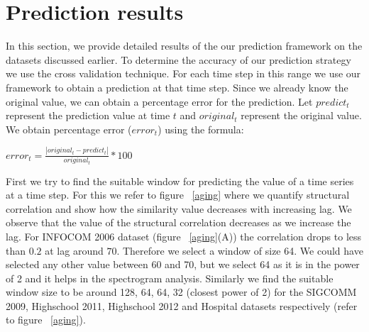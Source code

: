 \noindent
\section{Prediction results}
\label{result}
In this section, we provide detailed results of the our prediction framework on the datasets discussed earlier.
To determine the accuracy of our prediction strategy we use the cross validation technique.  
For each time step in this range we 
use our framework to obtain a prediction at that time step. Since we already know the original value, we can obtain a percentage error for the prediction.
Let $predict_{t}$ represent the prediction value at time $t$ and $original_{t}$ represent the original value. We obtain percentage error ($error_{t}$) using the formula:
\begin{center}
 {\large$error_{t}=\frac{|original_{t}-predict_{t}|}{original_{t}}*100$}
\end{center}

First we try to find the suitable window for predicting the value of a time series at a time step. For this we refer to figure ~\ref{aging} where 
we quantify structural correlation and show how the similarity value decreases with increasing lag.
We observe that the value of the structural correlation decreases as we increase the lag. For INFOCOM 2006 dataset (figure ~\ref{aging}(A)) the correlation drops to less than 
$0.2$ at lag around $70$.
Therefore we select a window of size 64. 
We could have selected any other value between 60 and 70, but we select 64 as it is in the power of 2 and it helps in the spectrogram 
analysis. Similarly we find the suitable window size to be around 128, 64, 64, 32 (closest power of 2) 
for the SIGCOMM 2009, Highschool 2011, Highschool 2012 and Hospital datasets respectively (refer to figure ~\ref{aging}). 


